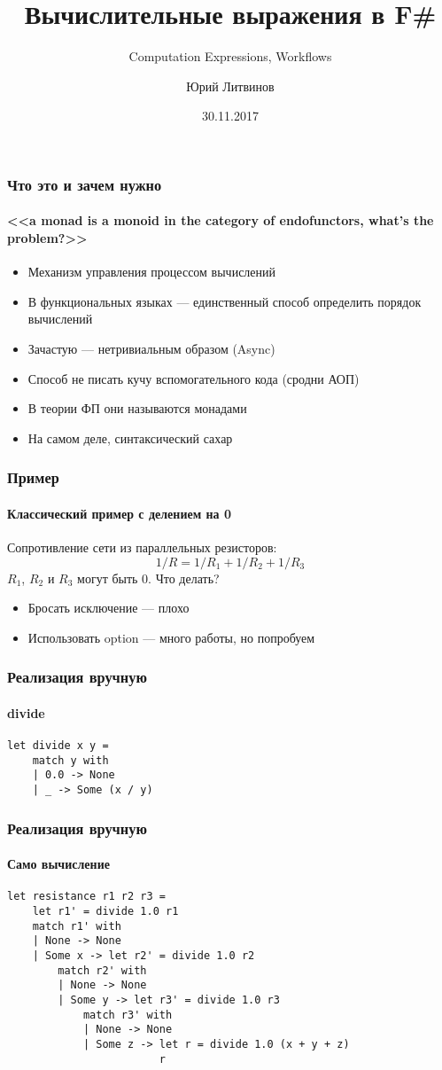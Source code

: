 \documentclass[xetex,mathserif,serif]{beamer}
\title{Вычислительные выражения в F\#}
\subtitle{Computation Expressions, Workflows}
\author{Юрий Литвинов}
\date{30.11.2017}
\begin{document}
	
	\frame{\titlepage}
	
	\begin{frame}
		\frametitle{Что это и зачем нужно}
		\framesubtitle{<<a monad is a monoid in the category of endofunctors, what's the problem?>>}
		\begin{itemize}
			\item Механизм управления процессом вычислений
			\item В функциональных языках --- единственный способ определить порядок вычислений
			\item Зачастую --- нетривиальным образом (Async)
			\item Способ не писать кучу вспомогательного кода (сродни АОП)
			\item В теории ФП они называются монадами
			\item На самом деле, синтаксический сахар
		\end{itemize}
	\end{frame}	

	\begin{frame}
		\frametitle{Пример}
		\framesubtitle{Классический пример с делением на 0}
		Сопротивление сети из параллельных резисторов:
		$$1/R = 1/R_1 + 1/R_2 + 1/R_3$$
		$R_1$, $R_2$ и $R_3$ могут быть 0. Что делать?
		\begin{itemize}
			\item Бросать исключение --- плохо
			\item Использовать option --- много работы, но попробуем
		\end{itemize}
	\end{frame}	

	\begin{frame}[fragile]
		\frametitle{Реализация вручную}
		\framesubtitle{divide}
		\begin{verbatim}
let divide x y =
    match y with
    | 0.0 -> None
    | _ -> Some (x / y)
		\end{verbatim}
\end{frame}

	\begin{frame}[fragile]
		\frametitle{Реализация вручную}
		\framesubtitle{Само вычисление}
		\begin{verbatim}
let resistance r1 r2 r3 =
    let r1' = divide 1.0 r1
    match r1' with
    | None -> None
    | Some x -> let r2' = divide 1.0 r2
        match r2' with
        | None -> None
        | Some y -> let r3' = divide 1.0 r3
            match r3' with
            | None -> None
            | Some z -> let r = divide 1.0 (x + y + z)
                        r
		\end{verbatim}
\end{frame}
\end{document}

